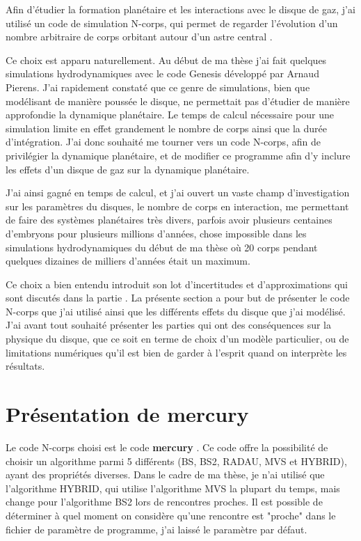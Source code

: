 Afin d'étudier la formation planétaire et les interactions avec le disque de gaz, j'ai utilisé un code de simulation N-corps, qui permet de regarder l'évolution d'un nombre arbitraire de corps orbitant autour d'un astre central \citep{chambers1999hybrid}. 

Ce choix est apparu naturellement. Au début de ma thèse j'ai fait quelques simulations hydrodynamiques avec le code Genesis développé par Arnaud Pierens. J'ai rapidement constaté que ce genre de simulations, bien que modélisant de manière poussée le disque, ne permettait pas d'étudier de manière approfondie la dynamique planétaire. Le temps de calcul nécessaire pour une simulation limite en effet grandement le nombre de corps ainsi que la durée d'intégration. J'ai donc souhaité me tourner vers un code N-corps, afin de privilégier la dynamique planétaire, et de modifier ce programme afin d'y inclure les effets d'un disque de gaz sur la dynamique planétaire. 

J'ai ainsi gagné en temps de calcul, et j'ai ouvert un vaste champ d'investigation sur les paramètres du disques, le nombre de corps en interaction, me permettant de faire des systèmes planétaires très divers, parfois avoir plusieurs centaines d'embryons pour plusieurs millions d'années, chose impossible dans les simulations hydrodynamiques du début de ma thèse où 20 corps pendant quelques dizaines de milliers d'années était un maximum. 

Ce choix a bien entendu introduit son lot d'incertitudes et d'approximations qui sont discutés dans la partie . La présente section a pour but de présenter le code N-corps que j'ai utilisé ainsi que les différents effets du disque que j'ai modélisé. J'ai avant tout souhaité présenter les parties qui ont des conséquences sur la physique du disque, que ce soit en terme de choix d'un modèle particulier, ou de limitations numériques qu'il est bien de garder à l'esprit quand on interprète les résultats.

\section{Présentation de mercury}
Le code N-corps choisi est le code \textbf{mercury} \citep{chambers1999hybrid}. Ce code offre la possibilité de choisir un algorithme parmi 5 différents (BS, BS2, RADAU, MVS et HYBRID), ayant des propriétés diverses. Dans le cadre de ma thèse, je n'ai utilisé que l'algorithme HYBRID, qui utilise l'algorithme MVS la plupart du temps, mais change pour l'algorithme BS2 lors de rencontres proches. Il est possible de déterminer à quel moment on considère qu'une rencontre est "proche" dans le fichier de paramètre de programme, j'ai laissé le paramètre par défaut. 

